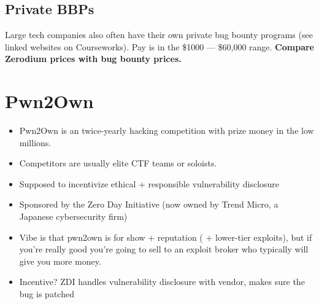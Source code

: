 \documentclass[11pt]{article}
\begin{document}
\subsection{Private BBPs}

Large tech companies also often have their own private bug bounty programs (see linked websites on Courseworks). Pay is in the \$1000 --- \$60,000 range. {\bf Compare Zerodium prices with bug bounty prices.}


\section{Pwn2Own}

\begin{itemize}
    \item Pwn2Own is an twice-yearly hacking competition with prize money in the low millions. 
    \item Competitors are usually elite CTF teams or soloists. 
    \item Supposed to incentivize ethical + responsible vulnerability disclosure
    \item Sponsored by the Zero Day Initiative (now owned by Trend Micro, a Japanese cybersecurity firm)
    \item Vibe is that pwn2own is for show + reputation ( + lower-tier exploits), but if you're really good you're going to sell to an exploit broker who typically will give you more money.
    \item Incentive? ZDI handles vulnerability disclosure with vendor, makes sure the bug is patched 
\end{itemize}
\end{document}
